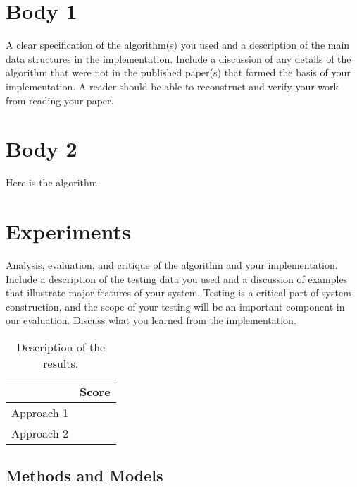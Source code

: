 \documentclass[11pt]{article}
\begin{document}
\section{Body 1}

A clear specification of the algorithm(s) you used and a description
of the main data structures in the implementation. Include a
discussion of any details of the algorithm that were not in the
published paper(s) that formed the basis of your implementation. A
reader should be able to reconstruct and verify your work from reading
your paper.

\section{Body 2}


\begin{algorithm}
  \begin{algorithmic}
    \EndProcedure{}
  \end{algorithmic}
  \caption{Here is the algorithm.}
\end{algorithm}



\section{Experiments}
Analysis, evaluation, and critique of the algorithm and your
implementation. Include a description of the testing data you used and
a discussion of examples that illustrate major features of your
system. Testing is a critical part of system construction, and the
scope of your testing will be an important component in our
evaluation. Discuss what you learned from the implementation.

\begin{table}
  \centering
  \begin{tabular}{ll}
    \toprule
    & Score \\
    \midrule
    Approach 1 & \\
    Approach 2 & \\
    \bottomrule
  \end{tabular}
  \caption{Description of the results.}
\end{table}

\subsection{Methods and Models}
\end{document}
